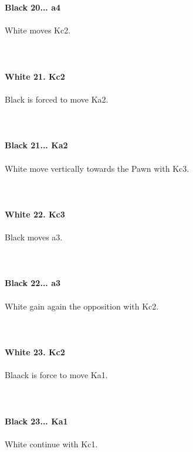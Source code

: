 \documentclass{article}
\begin{document}
\\
\\
\textbf{Black 20... a4}\\
\\
White moves Kc2.\\
\\

\\
\\
\textbf{White 21. Kc2}\\
\\
Black is forced to move Ka2.\\
\\

\\
\\
\textbf{Black 21... Ka2}\\
\\
White move vertically towards the Pawn with Kc3.\\
\\

\\
\\
\textbf{White 22. Kc3}\\
\\
Black moves a3.\\
\\

\\
\\
\textbf{Black 22... a3}\\
\\
White gain again the opposition with Kc2.\\
\\

\\
\\
\textbf{White 23. Kc2}\\
\\
Blaack is force to move Ka1.\\
\\

\\
\\
\textbf{Black 23... Ka1}\\
\\
White continue with Kc1.\\
\end{document}
